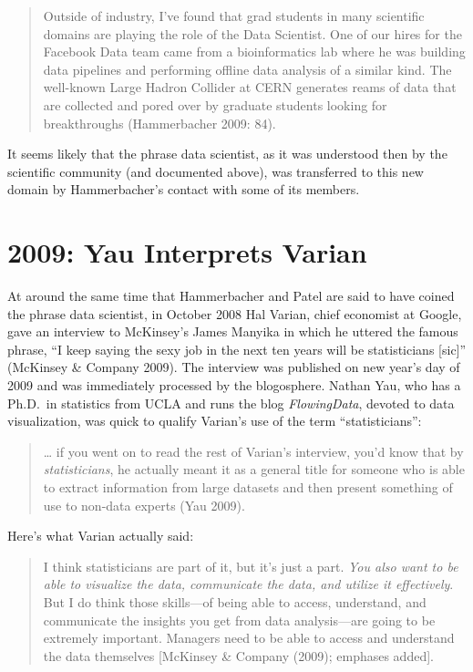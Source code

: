 \documentclass[
  letterpaper,
]{report}
\begin{document}
\begin{quote}
Outside of industry, I've found that grad students in many scientific
domains are playing the role of the Data Scientist. One of our hires for
the Facebook Data team came from a bioinformatics lab where he was
building data pipelines and performing offline data analysis of a
similar kind. The well-known Large Hadron Collider at CERN generates
reams of data that are collected and pored over by graduate students
looking for breakthroughs (Hammerbacher 2009: 84).
\end{quote}

It seems likely that the phrase data scientist, as it was understood
then by the scientific community (and documented above), was transferred
to this new domain by Hammerbacher's contact with some of its members.

\hypertarget{yau-interprets-varian}{%
\section{2009: Yau Interprets Varian}\label{yau-interprets-varian}}

At around the same time that Hammerbacher and Patel are said to have
coined the phrase data scientist, in October 2008 Hal Varian, chief
economist at Google, gave an interview to McKinsey's James Manyika in
which he uttered the famous phrase, ``I keep saying the sexy job in the
next ten years will be statisticians {[}sic{]}'' (McKinsey \& Company
2009). The interview was published on new year's day of 2009 and was
immediately processed by the blogosphere. Nathan Yau, who has a Ph.D.~in
statistics from UCLA and runs the blog \emph{FlowingData}, devoted to
data visualization, was quick to qualify Varian's use of the term
``statisticians'':

\begin{quote}
\ldots{} if you went on to read the rest of Varian's interview, you'd
know that by \emph{statisticians}, he actually meant it as a general
title for someone who is able to extract information from large datasets
and then present something of use to non-data experts (Yau 2009).
\end{quote}

Here's what Varian actually said:

\begin{quote}
I think statisticians are part of it, but it's just a part. \emph{You
also want to be able to visualize the data, communicate the data, and
utilize it effectively}. But I do think those skills---of being able to
access, understand, and communicate the insights you get from data
analysis---are going to be extremely important. Managers need to be able
to access and understand the data themselves {[}McKinsey \& Company
(2009); emphases added{]}.
\end{quote}
\end{document}
